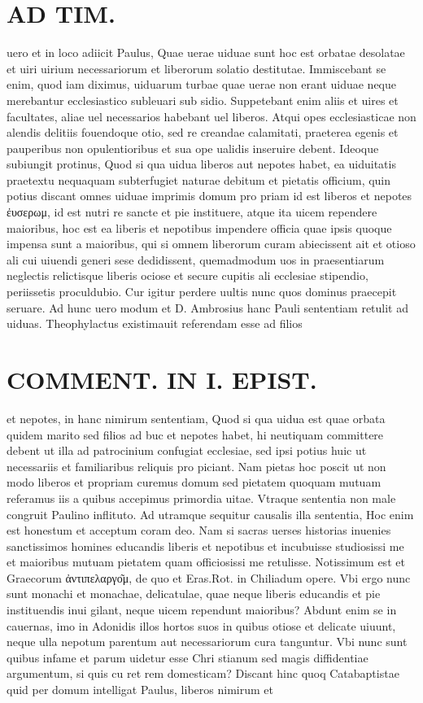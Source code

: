 \documentclass{article}
\begin{document}
\begin{pages}
\section*{AD TIM. }
\marginpar{[ p.149 ]}\pstart uero et in loco adiicit Paulus, Quae uerae uiduae sunt hoc est orbatae desolatae et uiri uirium necessariorum et liberorum solatio destitutae. Immiscebant se enim, quod iam diximus, uiduarum turbae quae uerae non erant uiduae neque merebantur ecclesiastico subleuari sub sidio. Suppetebant enim aliis et uires et facultates, aliae uel necessarios habebant uel liberos. Atqui opes ecclesiasticae non alendis delitiis fouendoque otio, sed re creandae calamitati, praeterea egenis et pauperibus non opulentioribus et sua ope ualidis inseruire debent. Ideoque subiungit protinus, Quod si qua uidua liberos aut nepotes habet, ea uiduitatis praetextu nequaquam subterfugiet naturae debitum et pietatis officium, quin potius discant omnes uiduae imprimis domum pro priam id est liberos et nepotes ἐυσερωμ, id est nutri re sancte et pie instituere, atque ita uicem rependere maioribus, hoc est ea liberis et nepotibus impendere officia quae ipsis quoque impensa sunt a maioribus, qui si omnem liberorum curam abiecissent ait et otioso ali cui uiuendi generi sese dedidissent, quemadmodum uos in praesentiarum neglectis relictisque liberis ociose et secure cupitis ali ecclesiae stipendio, periissetis proculdubio. Cur igitur perdere uultis nunc quos dominus praecepit seruare. Ad hunc uero modum et D. Ambrosius hanc Pauli sententiam retulit ad uiduas. Theophylactus existimauit referendam esse ad filios  \pend
\section*{COMMENT. IN I. EPIST. }\pstart et nepotes, in hanc nimirum sententiam, Quod si qua uidua est quae orbata quidem marito sed filios ad buc et nepotes habet, hi neutiquam committere debent ut illa ad patrocinium confugiat ecclesiae, sed ipsi potius huic ut necessariis et familiaribus reliquis pro piciant. Nam pietas hoc poscit ut non modo liberos et propriam curemus domum sed pietatem quoquam mutuam referamus iis a quibus accepimus primordia uitae. Vtraque sententia non male congruit Paulino inflituto. Ad utramque sequitur causalis illa sententia, Hoc enim est honestum et acceptum coram deo. Nam si sacras uerses historias inuenies sanctissimos homines educandis liberis et nepotibus et incubuisse studiosissi me et maioribus mutuam pietatem quam officiosissi me retulisse. Notissimum est et Graecorum ἀντιπελαργο͂μ, de quo et Eras.Rot. in Chiliadum opere. Vbi ergo nunc sunt monachi et monachae, delicatulae, quae neque liberis educandis et pie instituendis inui gilant, neque uicem rependunt maioribus? Abdunt enim se in cauernas, imo in Adonidis illos hortos suos in quibus otiose et delicate uiuunt, neque ulla nepotum parentum aut necessariorum cura tanguntur. Vbi nunc sunt quibus infame et parum uidetur esse Chri stianum sed magis diffidentiae argumentum, si quis cu ret rem domesticam? Discant hinc quoq Catabaptistae quid per domum intelligat Paulus, liberos nimirum et  \pend

\end{pages}
\end{document}
